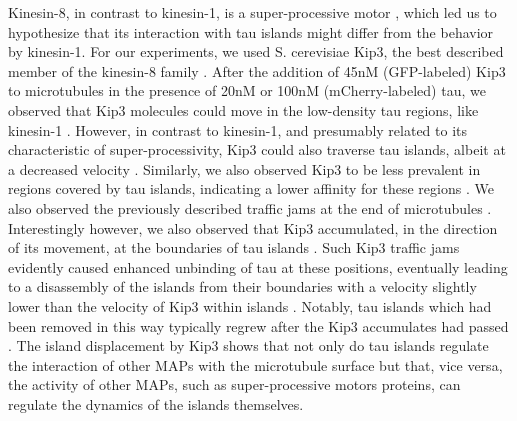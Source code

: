 Kinesin-8, in contrast to kinesin-1, is a super-processive motor , which led us to hypothesize that its interaction with tau islands might differ from the behavior by kinesin-1. For our experiments, we used S. cerevisiae Kip3, the best described member of the kinesin-8 family . After the addition of 45nM (GFP-labeled) Kip3 to microtubules in the presence of 20nM or 100nM (mCherry-labeled) tau, we observed that Kip3 molecules could move in the low-density tau regions, like kinesin-1 . However, in contrast to kinesin-1, and presumably related to its characteristic of super-processivity, Kip3 could also traverse tau islands, albeit at a decreased velocity . Similarly, we also observed Kip3 to be less prevalent in regions covered by tau islands, indicating a lower affinity for these regions . We also observed the previously described  traffic jams at the end of microtubules . Interestingly however, we also observed that Kip3 accumulated, in the direction of its movement, at the boundaries of tau islands . Such Kip3 traffic jams evidently caused enhanced unbinding of tau at these positions, eventually leading to a disassembly of the islands from their boundaries with a velocity slightly lower than the velocity of Kip3 within islands . Notably, tau islands which had been removed in this way typically regrew after the Kip3 accumulates had passed . The island displacement by Kip3 shows that not only do tau islands regulate the interaction of other MAPs with the microtubule surface but that, vice versa, the activity of other MAPs, such as super-processive motors proteins, can regulate the dynamics of the islands themselves.

